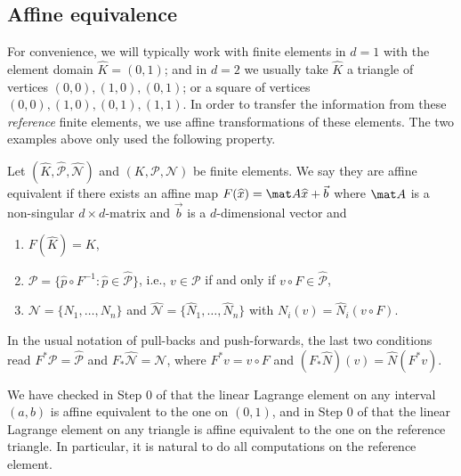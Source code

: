 \subsection{Affine equivalence}
\label{sec:FEM affine equivalence definition}

For convenience, we will typically work with finite elements in $d=1$ with the element domain $\widehat K = (0,1)$; and in $d=2$ we usually take $\widehat K$ a triangle of vertices $(0,0), (1,0), (0,1)$; or a square of vertices $(0,0),(1,0),(0,1), (1,1)$.
In order to transfer the information from these \emph{reference} finite elements, we use affine transformations of these elements.
The two examples above only used the following property.
\begin{definition}
    Let $(\widehat K, \widehat{\mathcal P}, \widehat{\mathcal N})$ and $(K, \mathcal P, \mathcal N)$ be finite elements.
    We say they are affine equivalent if there exists an affine map  $F(\widehat x) = \mat A \widehat x + \vec b$ where $\mat A$ is a non-singular $d \times d$-matrix and $\vec b$ is a $d$-dimensional vector and
    \begin{enumerate}
        \item $F(\widehat K) = K$,
        \item $\mathcal P = \{ \widehat p \circ F^{-1} : \widehat p \in \widehat{\mathcal P} \}$, i.e., $v \in \mathcal P$ if and only if $v \circ F \in \widehat{\mathcal P}$,
        \item $\mathcal N = \{ N_1, \dots, N_n\}$ and $\widehat{\mathcal N} = \{ \widehat N_1, \dots, \widehat N_n \}$ with $N_i (v) = \widehat N_i (v \circ F)$.
    \end{enumerate}
\end{definition}
In the usual notation of pull-backs and push-forwards, the last two conditions read $F^* \mathcal P = \widehat{\mathcal P}$ and $F_* \widehat{\mathcal N} = \mathcal N$, where $F^* v = v \circ F$ and $(F_* \widehat N) (v) = \widehat N (F^* v)$.

\begin{example}
    We have checked in Step 0 of  that the linear Lagrange element on any interval $(a,b)$ is affine equivalent to the one on $(0,1)$, and in Step 0 of  that the linear Lagrange element on any triangle is affine equivalent to the one on the reference triangle. In particular, it is natural to do all computations on the reference element.
\end{example}

